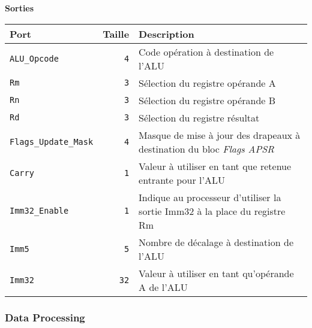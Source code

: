 \documentclass{article}
\begin{document}
    \vspace{1em}
    \textbf{Sorties}\\

    \begin{tabular}{|l|r|l|}
        \hline
        \textbf{Port}                 & \textbf{Taille} & \textbf{Description}                                                         \\
        \hline

        \texttt{ALU\_Opcode}        & \texttt{4}      & Code opération à destination de l'ALU                                        \\
        \hline
        \texttt{Rm}                & \texttt{3}      & Sélection du registre opérande A                                             \\
        \hline
        \texttt{Rn}                & \texttt{3}      & Sélection du registre opérande B                                             \\
        \hline
        \texttt{Rd}                & \texttt{3}      & Sélection du registre résultat                                               \\
        \hline
        \texttt{Flags\_Update\_Mask} & \texttt{4}      & Masque de mise à jour des drapeaux à destination du bloc \textit{Flags APSR} \\
        \hline
        \texttt{Carry}             & \texttt{1}      & Valeur à utiliser en tant que retenue entrante pour l'ALU                    \\
        \hline
        \texttt{Imm32\_Enable}      & \texttt{1}      & Indique au processeur d'utiliser la sortie Imm32 à la place du registre Rm   \\
        \hline
        \texttt{Imm5}              & \texttt{5}      & Nombre de décalage à destination de l'ALU                                    \\
        \hline
        \texttt{Imm32}             & \texttt{32}     & Valeur à utiliser en tant qu'opérande A de l'ALU                             \\

        \hline
    \end{tabular}

    \subsubsection{Data Processing}
    \label{sec:DataProc}
\end{document}
